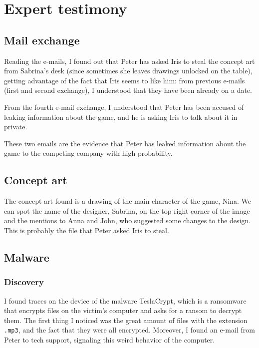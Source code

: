 \documentclass[12pt]{article}
\begin{document}
\section{Expert testimony}

\subsection{Mail exchange}
\label{sec:mail}

Reading the e-mails, I found out that Peter has asked Iris to steal the concept art from Sabrina's desk (since sometimes she leaves drawings unlocked on the table), getting advantage of the fact that Iris seems to like him: from previous e-mails (first and second exchange), I understood that they have been already on a date.

From the fourth e-mail exchange, I understood that Peter has been accused of leaking information about the game, and he is asking Iris to talk about it in private.

These two emails are the evidence that Peter has leaked information about the game to the competing company with high probability.

\subsection{Concept art}
\label{sec:art}

The concept art found is a drawing of the main character of the game, Nina. We can spot the name of the designer, Sabrina, on the top right corner of the image and the mentions to Anna and John, who suggested some changes to the design. This is probably the file that Peter asked Iris to steal.

\subsection{Malware}
\label{sec:malware}

\subsubsection{Discovery}
I found traces on the device of the malware TeslaCrypt, which is a ransomware that encrypts files on the victim's computer and asks for a ransom to decrypt them.
The first thing I noticed was the great amount of files with the extension \texttt{.mp3}, and the fact that they were all encrypted.
Moreover, I found an e-mail from Peter to tech support, signaling this weird behavior of the computer.
\end{document}

